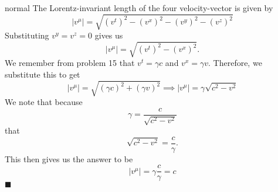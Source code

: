\begin{solution}{normal}
The Lorentz-invariant length of the four velocity-vector is given by 
\[|v^\mu| = \sqrt{(v^t)^2 - (v^x)^2 - (v^y)^2 - (v^z)^2}\]
Substituting $v^y = v^z = 0$ gives us 
\[|v^\mu| = \sqrt{(v^t)^2 - (v^x)^2}.\]
We remember from problem 15 that $v^t = \gamma c$ and $v^x = \gamma v$. Therefore, we substitute this to get 
\[|v^\mu| = \sqrt{(\gamma c)^2 + (\gamma v)^2}\implies |v^\mu| = \gamma \sqrt{c^2 - v^2}\]
We note that because 
\[\gamma = \frac{c}{\sqrt{c^2 - v^2}}\]
that 
\[\sqrt{c^2 - v^2} = \frac{c}{\gamma}.\]
This then gives us the answer to be 
\[|v^\mu| = \gamma\frac{c}{\gamma} = c\]
$\blacksquare$
\end{solution}